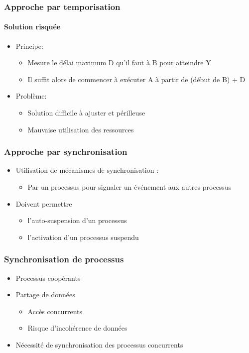 \begin{frame}
\frametitle{Approche par temporisation}
\framesubtitle{Solution risquée}
\begin{itemize}
\item Principe:
\begin{itemize}
\item Mesure le délai maximum D qu'il faut à B pour atteindre Y
\item Il suffit alors de commencer à exécuter A à partir de (début de B) + D
\end{itemize}
\item Problème:
\begin{itemize}
\item Solution difficile à ajuster et périlleuse
\item Mauvaise utilisation des ressources
\end{itemize}
\end{itemize}
\end{frame}

\begin{frame}
\frametitle{Approche par synchronisation}
\begin{itemize}
\item Utilisation de mécanismes de synchronisation :
\begin{itemize}
\item Par un processus pour signaler un événement aux autres processus
\end{itemize}
\item Doivent permettre
\begin{itemize}
\item l'auto-suspension d'un processus
\item l'activation d'un processus suspendu
\end{itemize}
\end{itemize}
\end{frame}

\begin{frame}
\frametitle{Synchronisation de processus}
\begin{itemize}
\item Processus coopérants
\item Partage de données
\begin{itemize}
\item Accès concurrents
\item Risque d’incohérence de données
\end{itemize}
\item Nécessité de synchronisation des processus concurrents
\end{itemize}
\end{frame}

